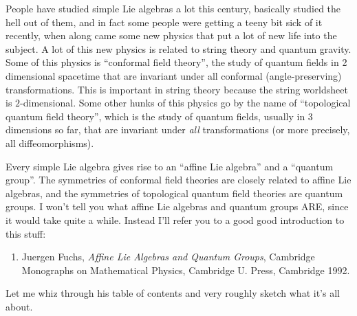 \documentclass{article}
\def\tightlist{}
\begin{document}
People have studied simple Lie algebras a lot this century, basically
studied the hell out of them, and in fact some people were getting a
teeny bit sick of it recently, when along came some new physics that put
a lot of new life into the subject. A lot of this new physics is related
to string theory and quantum gravity. Some of this physics is
``conformal field theory'', the study of quantum fields in 2 dimensional
spacetime that are invariant under all conformal (angle-preserving)
transformations. This is important in string theory because the string
worldsheet is \(2\)-dimensional. Some other hunks of this physics go by
the name of ``topological quantum field theory'', which is the study of
quantum fields, usually in 3 dimensions so far, that are invariant under
\emph{all} transformations (or more precisely, all diffeomorphisms).

Every simple Lie algebra gives rise to an ``affine Lie algebra'' and a
``quantum group''. The symmetries of conformal field theories are
closely related to affine Lie algebras, and the symmetries of
topological quantum field theories are quantum groups. I won't tell you
what affine Lie algebras and quantum groups ARE, since it would take
quite a while. Instead I'll refer you to a good good introduction to
this stuff:

\begin{enumerate}
\def\labelenumi{\arabic{enumi})}
\tightlist
\item
  Juergen Fuchs, \emph{Affine Lie Algebras and Quantum Groups},
  Cambridge Monographs on Mathematical Physics, Cambridge U. Press,
  Cambridge 1992.
\end{enumerate}

Let me whiz through his table of contents and very roughly sketch what
it's all about.
\end{document}
